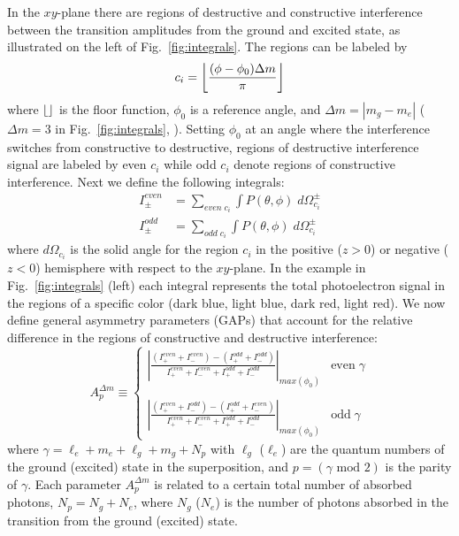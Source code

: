 In the $xy$-plane there are regions of destructive and constructive interference between the transition amplitudes from the ground and excited state, as illustrated on the left of Fig.~\ref{fig:integrals}. The regions can be labeled by
\begin{equation}
    c_i = \floor*{\frac{(\phi-\phi_0)\Delta m}{\pi}}
\end{equation}
where $\floor{}$ is the floor function, $\phi_0$ is a reference angle, and $\Delta m=|m_g-m_e|$ ($\Delta m = 3$ in Fig.~\ref{fig:integrals}, \cite{footnote}). Setting $\phi_0$ at an angle where the interference switches from constructive to destructive, regions of destructive interference signal are labeled by even $c_i$ while odd $c_i$ denote regions of constructive interference. 
Next we define the following integrals:
\begin{align}
    I^{even}_{\pm} &= \sum_{even \; c_i} \int P(\theta,\phi)\; d\Omega_{c_i}^{\pm}\\
    I^{odd}_{\pm} &= \sum_{odd \; c_i} \int P(\theta,\phi)\; d\Omega_{c_i}^{\pm}
\end{align}
where $d\Omega_{c_i}$ is the solid angle for the region $c_i$ in the positive ($z>0$) or negative ($z<0$) hemisphere with respect to the $xy$-plane. In the example in Fig.~\ref{fig:integrals} (left) each integral represents the total photoelectron signal in the regions of a specific color (dark blue, light blue, dark red, light red). We now define general asymmetry parameters (GAPs) that account for the relative difference in the regions of constructive and destructive interference: 
\begin{equation}
\label{gaps}
    A_{p}^{\Delta m} \equiv \begin{cases} 
      \left|\frac{(I^{even}_+ + I^{even}_-) - (I^{odd}_++I^{odd}_-)}{I^{even}_++I^{even}_- + I^{odd}_++I^{odd}_-}\right|_{max(\phi_0)} & \text{even} \;  \gamma  \\ 
      \\
      \left|\frac{(I^{even}_++I^{odd}_-) - (I^{odd}_++I^{even}_-)}{I^{even}_++I^{even}_- + I^{odd}_++I^{odd}_-}\right|_{max(\phi_0)} & \text{odd} \;  \gamma 
  \end{cases}
\end{equation}
where $\gamma = \ell_e + m_e + \ell_g + m_g + N_p$ with $\ell_g$ ($\ell_e$) are the quantum numbers of the ground (excited) state in the superposition, and $p=(\gamma \text{ mod } 2)$ is the parity of $\gamma$. Each parameter $A_{p}^{\Delta m}$ is related to a certain total number of absorbed photons, $N_p = N_{g}+N_{e}$, where $N_g$ ($N_e$) is the number of photons absorbed in the transition from the ground (excited) state. 
